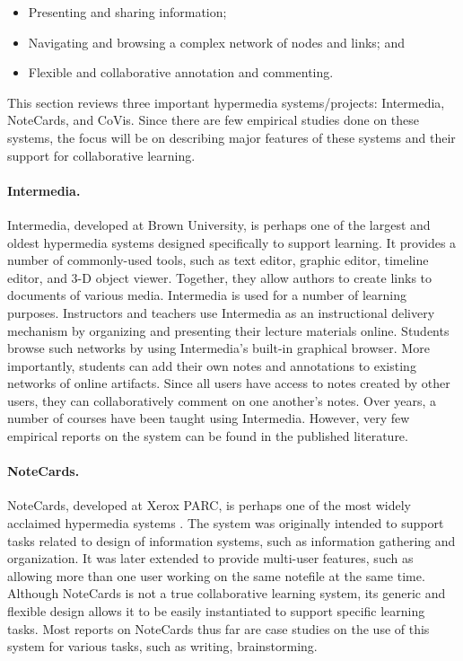 \begin{itemize}
\item Presenting and sharing information;
  
\item Navigating and browsing a complex
network of nodes and links; and

\item Flexible and collaborative annotation and commenting.
\end{itemize}

This section reviews three important hypermedia systems/projects:
Intermedia, NoteCards, and CoVis. Since there are few empirical studies
done on these systems, the focus will be on describing major features of
these systems and their support for collaborative learning.


\paragraph{Intermedia.}

Intermedia, developed at Brown University, is perhaps one of the largest
and oldest hypermedia systems designed specifically to support learning.
It provides a number of commonly-used tools, such as text editor, graphic
editor, timeline editor, and 3-D object viewer. Together, they allow
authors to create links to documents of various media. Intermedia is used
for a number of learning purposes. Instructors and teachers use Intermedia
as an instructional delivery mechanism by organizing and presenting their
lecture materials online. Students browse such networks by using
Intermedia's built-in graphical browser. More importantly, students can add
their own notes and annotations to existing networks of online
artifacts. Since all users have access to notes created by other users,
they can collaboratively comment on one another's notes. Over years, a
number of courses have been taught using Intermedia.  However, very few
empirical reports on the system can be found in the published literature.

\paragraph{NoteCards.}

NoteCards, developed at Xerox PARC, is perhaps one of the most widely
acclaimed hypermedia systems
\cite{HALASZ87Reflections,Trigg88Guided,Trigg87Hypertext,Marshall89Guided}.
The system was originally intended to support tasks related to design of
information systems, such as information gathering and organization. It was
later extended to provide multi-user features, such as allowing more than
one user working on the same notefile at the same time. Although NoteCards
is not a true collaborative learning system, its generic and flexible
design allows it to be easily instantiated to support specific learning
tasks.  Most reports on NoteCards thus far are case studies on the use of
this system for various tasks, such as writing, brainstorming.


